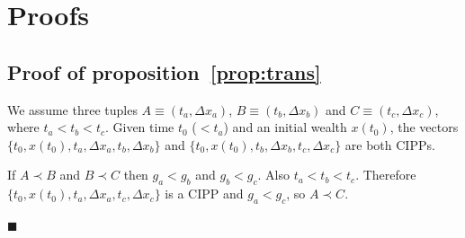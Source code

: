 \documentclass[11pt]{article}
\newcommand*{\qed}{\hfill\ensuremath{\blacksquare}}%
\newcommand{\preflong}[1]{proposition~\ref{prop:#1}}
\newcommand{\Dx}{\Delta x}
\numberwithin{equation}{section}
\begin{document}


\newpage




\clearpage

\appendix


\section{Proofs}
\label{app:appA}

\subsection{Proof of \preflong{trans}}

We assume three tuples $A\equiv\left(t_a,\Dx_a\right)$, $B\equiv\left(t_b,\Dx_b\right)$ and $C\equiv\left(t_c,\Dx_c\right)$, where $t_a < t_b < t_c$. Given time $t_0$ ($< t_a$) and an initial wealth $x\left(t_0\right)$, the vectors $\{t_0,x\left(t_0\right),t_a,\Dx_a,t_b,\Dx_b\}$ and $\{t_0,x\left(t_0\right),t_b,\Dx_b,t_c,\Dx_c\}$ are both CIPPs.

If $A \prec B$ and $B \prec C$ then $g_a < g_b$ and $g_b < g_c$. Also $t_a < t_b < t_c$. Therefore $\{t_0,x\left(t_0\right),t_a,\Dx_a,t_c,\Dx_c\}$ is a CIPP and $g_a < g_c$, so $A \prec C$.

\qed
\end{document}
